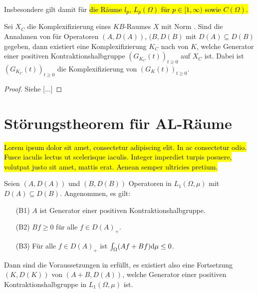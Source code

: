 \par
Insbesondere gilt  damit für \hl{die Räume $l_p$, $L_p(\Omega)$ für $p\in [1,\infty)$ sowie $C(\Omega)$. }



\begin{fsatz}
Sei $X_C$ die Komplexifizierung eines $KB$-Raumes $X$ mit Norm \Cref{}. Sind die Annahmen von  für Operatoren $(A, D(A))$, $(B, D(B)$ mit $D(A)\subseteq D(B)$ gegeben, dann existiert eine Komplexifizierung $K_C$ nach \Cref{} von $K$, welche Generator einer positiven Kontraktionshalbgruppe $(G_{K_C}(t))_{t\geq0}$ auf  $X_C$ ist. Dabei ist $(G_{K_C}(t))_{t\geq0}$ die Komplexifizierung von $(G_K(t))_{t\geq0}$.
\end{fsatz}

\begin{proof}
Siehe [...]
\end{proof}

\section{Störungstheorem für AL-Räume}

\hl{Lorem ipsum dolor sit amet, consectetur adipiscing elit. In ac consectetur odio. Fusce iaculis lectus ut scelerisque iaculis. Integer imperdiet turpis posuere, volutpat justo sit amet, mattis erat. Aenean semper ultricies pretium.}



\begin{fsatz}
Seien $(A, D(A))$ und $(B, D(B))$ Operatoren in  $L_1(\Omega, \mu)$ mit $D(A)\subseteq D(B)$. Angenommen, es gilt:
\begin{enumerate}
\item[\textnormal{(B1)}] $A$ ist Generator einer positiven Kontraktionshalbgruppe.
\item[\textnormal{(B2)}] $Bf\geq0$ für alle $f\in D(A)_+$.
\item[\textnormal{(B3)}] Für alle $f\in D(A)_+$ ist $\int_\Omega (Af+Bf)\textnormal d\mu\leq 0$.
\end{enumerate}
Dann sind die Voraussetzungen in  erfüllt, es existiert also eine Fortsetzung $(K, D(K))$ von $(A+B, D(A))$, welche Generator einer positiven Kontraktionshalbgruppe in $L_1(\Omega, \mu)$ ist.
\end{fsatz}

